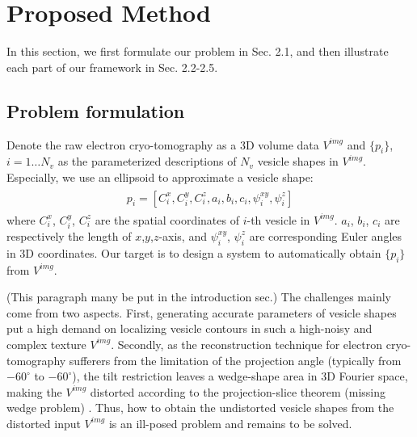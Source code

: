 \section{Proposed Method}
\label{sec:method}

In this section, we first formulate our problem in Sec. 2.1, and then illustrate each part of our framework in Sec. 2.2-2.5.

\subsection{Problem formulation}
Denote the raw electron cryo-tomography as a 3D volume data $V^{img}$ and $\{p_i\}$, $i=1\ldots N_v$ as the parameterized descriptions of $N_v$ vesicle shapes in $V^{img}$. Especially, we use an ellipsoid to approximate a vesicle shape:
\begin{eqnarray}\label{eq:pi}
\begin{aligned}
p_i=[C_i^x,C_i^y,C_i^z,a_i,b_i,c_i,\psi_i^{xy},\psi_i^z]
\end{aligned}
\end{eqnarray}
where $C_i^x$, $C_i^y$, $C_i^z$ are the spatial coordinates of $i$-th vesicle in $V^{img}$.
$a_i$, $b_i$, $c_i$ are respectively the length of $x$,$y$,$z$-axis, and  $\psi_i^{xy}$, $\psi_i^{z}$ are corresponding Euler angles in 3D coordinates.
Our target is to design a system to automatically obtain $\{p_i\}$ from $V^{img}$.

(This paragraph many be put in the introduction sec.)
The challenges mainly come from two aspects.
First, generating accurate parameters of vesicle shapes put a high demand on localizing vesicle contours in such a high-noisy and complex texture $V^{img}$.
Secondly, as the reconstruction technique for electron cryo-tomography sufferers from the limitation of the projection angle (typically from $-60^{\circ}$ to $-60^{\circ}$), the tilt restriction leaves a wedge-shape area in 3D Fourier space, making the $V^{img}$ distorted \cite{Lucic2005} according to the projection-slice theorem (missing wedge problem) \cite{Chen2014}.
Thus, how to obtain the undistorted vesicle shapes from the distorted input $V^{img}$ is an ill-posed problem and remains to be solved. 

